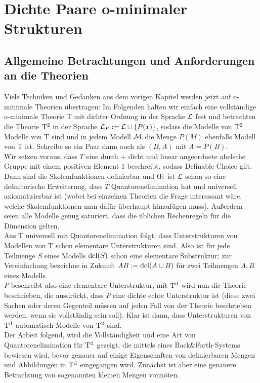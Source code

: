 \chapter{Dichte Paare o-minimaler Strukturen}
\section{Allgemeine Betrachtungen und Anforderungen an die Theorien}

Viele Techniken und Gedanken aus dem vorigen Kapitel werden jetzt auf o-minimale Theorien übertragen: Im Folgenden halten wir einfach eine vollständige o-minimale Theorie T mit dichter Ordnung in der Sprache $\mathcal{L}$ fest und betrachten die Theorie $\operatorname{T^2}$ in der Sprache $\mathcal{L}_P:=\mathcal{L}\cup\{P(x)\}$, sodass die Modelle von $\operatorname{T^2}$ Modelle von T sind und in jedem Modell $\mathcal{M}$ die Menge $P(M)$ ebenfalls Modell von T ist. Schreibe so ein Paar dann auch als $(B,A)$ mit $A=P(B)$.\\
Wir setzen voraus, dass $T$ eine durch $+$ dicht und linear angeordnete abelsche Gruppe mit einem positiven Element $1$ beschreibt, sodass Definable Choice gilt. Dann sind die Skolemfunktionen definierbar und \OE\ ist $\mathcal{L}$ schon so eine definitorische Erweiterung, dass $T$ Quantorenelimination hat und universell axiomatisierbar ist (wobei bei einzelnen Theorien die Frage interessant wäre, welche Skolemfunktionen man dafür überhaupt hinzufügen muss). Außerdem seien alle Modelle genug saturiert, dass die üblichen Rechenregeln für die Dimension gelten.\\
Aus T universell mit Quantorenelimination folgt, dass Unterstrukturen von Modellen von T schon elementare Unterstrukturen sind. Also ist für jede Teilmenge $S$ eines Modells $\operatorname{dcl}(S)$ schon eine elementare Substruktur; zur Vereinfachung bezeichne in Zukunft $AB:=\operatorname{dcl}(A\cup B)$ für zwei Teilmengen $A,B$ eines Modells.\\
$P$ beschreibt also eine elementare Unterstruktur, mit $\operatorname{T^d}$ wird nun die Theorie beschrieben, die ausdrückt, dass $P$ eine dichte echte Unterstruktur ist (diese zwei Sachen oder deren Gegenteil müssen auf jeden Fall von der Theorie beschrieben werden, wenn sie vollständig sein soll). Klar ist dann, dass Unterstrukturen von $\operatorname{T^d}$ automatisch Modelle von $\operatorname{T^2}$ sind.\\
Der Arbeit \cite{VanDenDries} folgend, wird die Vollständigkeit und eine Art von Quantorenelimination für $\operatorname{T^d}$ gezeigt, die mittels eines Back\&Forth-Systems bewiesen wird, bevor genauer auf einige Eigenschaften von definierbaren Mengen und Abbildungen in $\operatorname{T^d}$ eingegangen wird. Zunächst ist aber eine genauere Betrachtung von sogenannten kleinen Mengen vonnöten.

